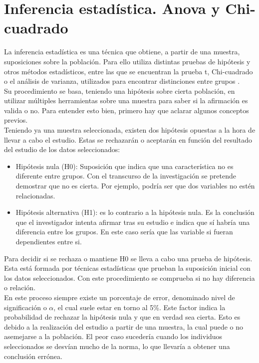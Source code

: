 \chapter{Inferencia estadística. Anova y Chi-cuadrado}

La inferencia estadística es una técnica que obtiene, a partir de una muestra, suposiciones sobre la población. Para ello utiliza distintas pruebas de hipótesis y otros métodos estadísticos, entre las que se encuentran la prueba t, Chi-cuadrado o el análisis de varianza, utilizados para encontrar distinciones entre grupos \cite{INFERENC93:online}.  \\

Su procedimiento se basa, teniendo una hipótesis sobre cierta población, en utilizar múltiples herramientas sobre una muestra para saber si la afirmación es valida o no. Para entender esto bien, primero hay que aclarar algunos conceptos previos.\\

Teniendo ya una muestra seleccionada, existen dos hipótesis opuestas a la hora de llevar a cabo el estudio. Estas se rechazarán o aceptarán en función del resultado del estudio de los datos seleccionados: 

\begin{itemize}
	\item Hipótesis nula (H0): Suposición que indica que una característica no es diferente entre grupos. Con el transcurso de la investigación se pretende demostrar que no es cierta. Por ejemplo, podría ser que dos variables no estén relacionadas.
	\item Hipótesis alternativa (H1): es lo contrario a la hipótesis nula. Es la conclusión que el investigador intenta afirmar tras su estudio e indica que sí habría una diferencia entre los grupos. En este caso sería que las variable si fueran dependientes entre si.
\end{itemize}

Para decidir si se rechaza o mantiene H0 se lleva a cabo una prueba de hipótesis. Esta está formada por técnicas estadísticas que prueban la suposición inicial con los datos seleccionados. Con este procedimiento se comprueba si no hay diferencia o relación. \\

En este proceso siempre existe un porcentaje de error, denominado nivel de significación o $\alpha$, el cual suele estar en torno al 5\%. Este factor indica la probabilidad de rechazar la hipótesis nula y que en verdad sea cierta. Esto es debido a la realización del estudio a partir de una muestra, la cual puede o no asemejarse a la población. El peor caso sucedería cuando los individuos seleccionados se desvían mucho de la norma, lo que llevaría a obtener una conclusión errónea.\\

